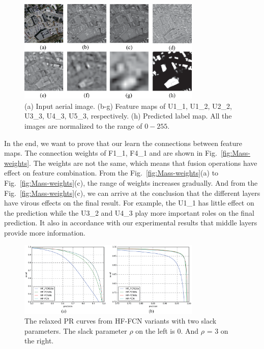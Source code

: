 \begin{figure}
\begin{center}
\includegraphics[width=8.7cm]{Figures/feature_maps.eps}
\caption{(a) Input aerial image. (b-g) Feature maps of U1\_1, U1\_2, U2\_2, U3\_3, U4\_3, U5\_3, respectively. (h) Predicted label map. All the images are normalized to the range of ${0-255}$.}
\label{fig:feature_maps}
\end{center}
\end{figure}


In the end, we want to prove that our  learn the connections between feature maps. The connection weights of F1\_1, F4\_1 and  are shown in Fig.~\ref{fig:Mass-weights}.
The weights are not the same, which means that fusion operations have effect on feature combination.
From the Fig.~\ref{fig:Mass-weights}(a) to Fig.~\ref{fig:Mass-weights}(c), the range of weights increases gradually.
And from the Fig.~\ref{fig:Mass-weights}(c), we can arrive at the conclusion that the different layers have virous effects on the final result.
For example, the U1\_1 has little effect on the prediction while the U3\_2 and U4\_3 play more important roles on the final prediction.
It also in accordance with our experimental results that middle layers provide more information.

\begin{figure}
\vspace{-0.2cm}
\setlength{\abovecaptionskip}{-0cm}
\setlength{\belowcaptionskip}{-2cm}
\centering
\includegraphics[width=8.7cm]{Figures/HF-FCN-variant-PR.eps}
\caption{The relaxed PR curves from HF-FCN variants with two slack parameters. The slack parameter $\rho$ on the left is 0. And $\rho$ = 3 on the right.}
\label{fig:Mass-variants-PR}
\end{figure}

